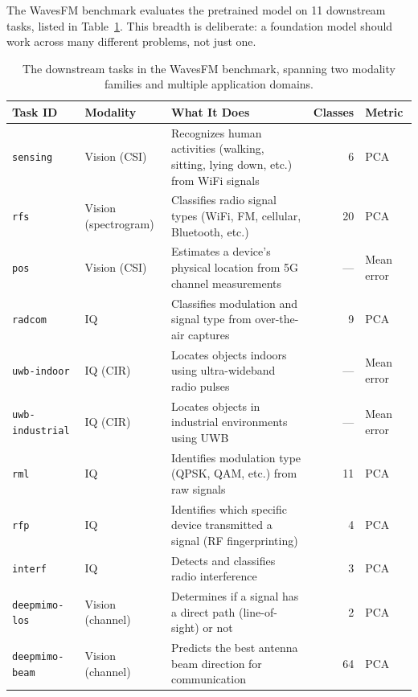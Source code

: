 \documentclass[11pt]{article}
\newcommand{\code}[1]{\texttt{#1}}
\begin{document}
The WavesFM benchmark evaluates the pretrained model on 11 downstream tasks, listed in Table~\ref{tab:tasks}. This breadth is deliberate: a foundation model should work across many different problems, not just one.

\begin{table}[H]
\centering
\caption{The downstream tasks in the WavesFM benchmark, spanning two modality families and multiple application domains.}
\label{tab:tasks}
\small
\begin{tabular}{lp{2.5cm}p{4.5cm}rl}
\toprule
\textbf{Task ID} & \textbf{Modality} & \textbf{What It Does} & \textbf{Classes} & \textbf{Metric} \\
\midrule
\code{sensing}       & Vision (CSI)       & Recognizes human activities (walking, sitting, lying down, etc.) from WiFi signals & 6   & PCA \\
\code{rfs}           & Vision (spectrogram) & Classifies radio signal types (WiFi, FM, cellular, Bluetooth, etc.)~\cite{zahid2024commrad} & 20  & PCA \\
\code{pos}           & Vision (CSI)       & Estimates a device's physical location from 5G channel measurements & ---  & Mean error \\
\code{radcom}        & IQ                 & Classifies modulation and signal type from over-the-air captures & 9   & PCA \\
\code{uwb-indoor}    & IQ (CIR)           & Locates objects indoors using ultra-wideband radio pulses & ---  & Mean error \\
\code{uwb-industrial}& IQ (CIR)           & Locates objects in industrial environments using UWB & ---  & Mean error \\
\code{rml}           & IQ                 & Identifies modulation type (QPSK, QAM, etc.) from raw signals & 11  & PCA \\
\code{rfp}           & IQ                 & Identifies which specific device transmitted a signal (RF fingerprinting) & 4   & PCA \\
\code{interf}        & IQ                 & Detects and classifies radio interference & 3   & PCA \\
\code{deepmimo-los}  & Vision (channel)   & Determines if a signal has a direct path (line-of-sight) or not & 2   & PCA \\
\code{deepmimo-beam} & Vision (channel)   & Predicts the best antenna beam direction for communication & 64  & PCA \\
\bottomrule
\end{tabular}
\end{table}
\end{document}
